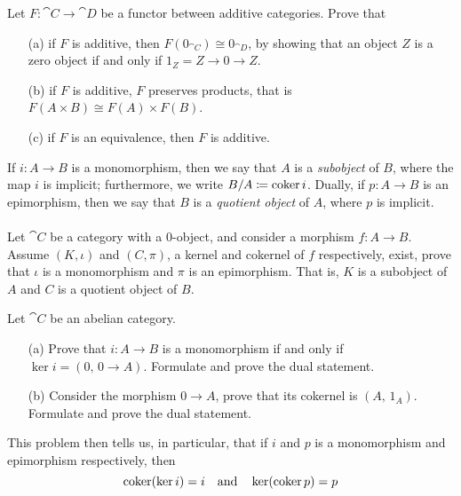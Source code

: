 \vspace*{0.1in}

\begin{problem}\label{prob C.3}
Let $F: \cat{C} \to \cat{D}$ be a functor between additive categories. Prove that
\begin{itemize}
\item[(a)] if $F$ is additive, then $F(0_{\cat{C}}) \cong 0_{\cat{D}}$, by showing that an object $Z$ is a zero object if and only if $1_Z = Z \to 0 \to Z$.
\item[(b)] if $F$ is additive, $F$ preserves products, that is $F(A \times B) \cong F(A) \times F(B)$.
\item[(c)] if $F$ is an equivalence, then $F$ is additive.
\end{itemize}
\end{problem}

\vspace*{0.1in}

\begin{problem}\label{prob C.4}
If $i: A \to B$ is a monomorphism, then we say that $A$ is a \emph{subobject} of $B$, where the map $i$ is implicit; furthermore, we write $B/A \coloneqq \operatorname{coker} i$. Dually, if $p:A \to B$ is an epimorphism, then we say that $B$ is a \emph{quotient object} of $A$, where $p$ is implicit.\\
\\
Let $\cat{C}$ be a category with a $0$-object, and consider a morphism $f:A \to B$. Assume $(K,\iota)$ and $(C,\pi)$, a kernel and cokernel of $f$ respectively, exist, prove that $\iota$ is a monomorphism and $\pi$ is an epimorphism. That is, $K$ is a subobject of $A$ and $C$ is a quotient object of $B$.
\end{problem}


\begin{problem}\label{prob C.5}
Let $\cat{C}$ be an abelian category.
\begin{itemize}
\item[(a)] Prove that $i:A \to B$ is a monomorphism if and only if $\ker i = (0,\,0 \to A)$. Formulate and prove the dual statement.
\item[(b)] Consider the morphism $0 \to A$, prove that its cokernel is $(A,\,1_A)$. Formulate and prove the dual statement.
\end{itemize}
This problem then tells us, in particular, that if $i$ and $p$ is a monomorphism and epimorphism respectively, then
\[\operatorname{coker}(\ker i) = i\quad \text{and} \quad \ker(\operatorname{coker} p) = p\]
\end{problem}


